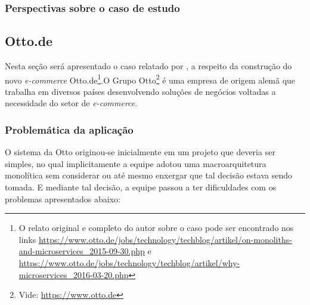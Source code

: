 \subsubsection{Perspectivas sobre o caso de estudo}



\subsection{Otto.de}

Nesta seção será apresentado o caso relatado por  , a
respeito da construção do novo \textit{e-commerce} Otto.de\footnote{O relato original e completo do autor
sobre o caso pode ser encontrado nos links
\url{https://www.otto.de/jobs/technology/techblog/artikel/on-monoliths-and-microservices_2015-09-30.php}
e \url{https://www.otto.de/jobs/technology/techblog/artikel/why-microservices_2016-03-20.php}}.O Grupo
Otto\footnote{Vide: \url{https://www.otto.de}} é uma empresa de origem alemã que trabalha em diversos países
desenvolvendo soluções de negócios voltadas a necessidade do setor de \textit{e-commerce}.

\subsubsection{Problemática da aplicação}

O sistema da Otto originou-se inicialmente em um projeto que deveria ser simples, no qual
implicitamente a equipe adotou uma macroarquitetura monolítica sem considerar ou até mesmo enxergar
que tal decisão estava sendo tomada. E mediante tal decisão, a equipe passou a ter dificuldades
com os problemas apresentados abaixo:

